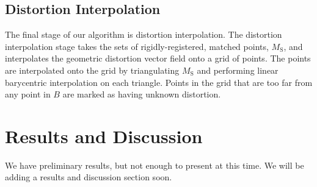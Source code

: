 \documentclass[12pt]{article}
\begin{document}
\subsection{Distortion Interpolation}

The final stage of our algorithm is distortion interpolation.  The distortion interpolation stage takes the sets of rigidly-registered, matched points, $M_\textrm{S}$, and interpolates the geometric distortion vector field onto a grid of points. The points are interpolated onto the grid by triangulating $M_\textrm{S}$ and performing linear barycentric interpolation on each triangle. Points in the grid that are too far from any point in $B$ are marked as having unknown distortion.

\section{Results and Discussion}

We have preliminary results, but not enough to present at this time.  We will be adding a results and discussion section soon.



\end{document}

